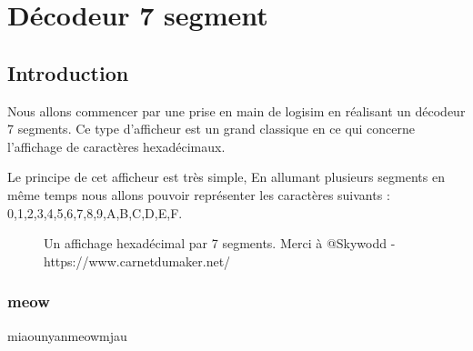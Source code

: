 \section{Décodeur 7 segment}
\subsection{Introduction}
Nous allons commencer par une prise en main de logisim en réalisant un décodeur 7 segments. Ce type d'afficheur est un grand classique en ce qui concerne l'affichage de caractères hexadécimaux.

Le principe de cet afficheur est très simple, En allumant plusieurs segments en même temps nous allons pouvoir représenter les caractères suivants :
0,1,2,3,4,5,6,7,8,9,A,B,C,D,E,F.

\begin{figure}
	\caption{Un affichage hexadécimal par 7 segments. Merci à @Skywodd - https://www.carnetdumaker.net/}
\end{figure}

\subsubsection{meow}
miaounyanmeowmjau

